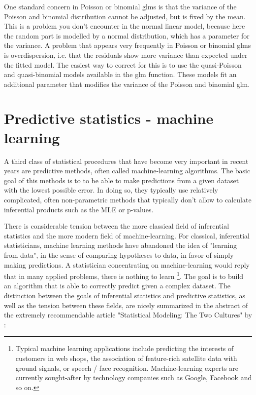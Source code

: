 \documentclass[a4paper,twoside]{tufte-book}\usepackage[]{graphicx}\usepackage[]{color}
\begin{document}
One standard concern in Poisson or binomial glms is that the variance of the Poisson and binomial distribution cannot be adjusted, but is fixed by the mean. This is a problem you don't encounter in the normal linear model, because here the random part is modelled by a normal distribution, which has a parameter for the variance. A problem that appears very frequently in Poisson or binomial glms is overdispersion, i.e. that the residuals show more variance than expected under the fitted model.  The easiest way to correct for this is to use the quasi-Poisson and quasi-binomial models available in the glm function. These models fit an additional parameter that modifies the variance of the Poisson and binomial glm. 


\chapter{Predictive statistics - machine learning}

A third class of statistical procedures that have become very important in recent years are predictive methods, often called machine-learning algorithms. The basic goal of this methods is to to be able to make predictions from a given dataset with the lowest possible error. In doing so, they typically use relatively complicated, often non-parametric methods that typically don't allow to calculate inferential products such as the MLE or p-values.

There is considerable tension between the more classical field of inferential statistics and the more modern field of machine-learning. For classical, inferential statisticians, machine learning methods have abandoned the idea of "learning from data", in the sense of comparing hypotheses to data, in favor of simply making predictions. A statistician concentrating on machine-learning would reply that in many applied problems, there is nothing to learn \footnote{Typical machine learning applications include predicting the interests of customers in web shops, the association of feature-rich satellite data with ground signals, or speech / face recognition. Machine-learning experts are currently sought-after by technology companies such as Google, Facebook and so on.}. The goal is to build an algorithm that is able to correctly predict given a complex dataset. The distinction between the goals of inferential statistics and predictive statistics, as well as the tension between these fields, are nicely summarized in the abstract of the extremely recommendable article "Statistical Modeling: The Two Cultures" by \citet{Breiman-StatisticalModelingTwo-2001}:
\end{document}
